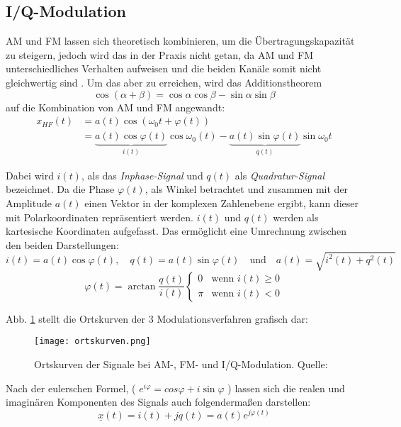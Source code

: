 \subsection{I/Q-Modulation}
\label{iq}
\ac{AM} und \ac{FM} lassen sich theoretisch kombinieren, um die Übertragungskapazität zu steigern, jedoch wird das in der Praxis nicht getan, da AM und FM unterschiedliches Verhalten aufweisen und die beiden Kanäle somit nicht gleichwertig sind \cite[vgl. Heuberger, e. a., S. 40]{Heuberger:2017}. Um das aber zu erreichen, wird das Additionstheorem 
\[ \cos (\alpha + \beta) = \cos \alpha \cos \beta - \sin \alpha \sin \beta\] 
auf die Kombination von AM und FM angewandt:
\begin{align*}
	x_{HF}(t) &= a(t) \cos (\omega_0 t + \varphi(t)) \\
			  &= \underbrace{a(t) \cos \varphi(t)}_{i(t)} \cos \omega_0(t) - \underbrace{a(t) \sin \varphi(t)}_{q(t)} \sin \omega_0t
\end{align*}

Dabei wird \(i(t) \),  als das \textit{Inphase-Signal} und \(q(t)\) als \textit{Quadratur-Signal} bezeichnet.
Da die Phase $\varphi(t)$, als Winkel betrachtet und zusammen mit der Amplitude $a(t)$ einen Vektor in der komplexen Zahlenebene ergibt, kann dieser mit Polarkoordinaten repräsentiert werden.
$i(t)$ und $q(t)$ werden als kartesische Koordinaten aufgefasst.
Das ermöglicht eine Umrechnung zwischen den beiden Darstellungen:
\[ i(t) = a(t) \cos \varphi(t),  \quad q(t) = a(t)\sin \varphi(t) \quad \text{und} \quad  a(t) = \sqrt{i^2 (t) + q^2(t)}\]
\[  \varphi (t) = \arctan \frac{q(t)}{i(t)}  
					\begin{cases} 
						0	 & \text{wenn } i(t) \geq 0 \\
						\pi  & \text{wenn } i(t) < 0
					\end{cases}
\]

Abb. \ref{ortskurven} stellt die Ortskurven der 3 Modulationsverfahren grafisch dar:
\begin{figure}[ht]
	\centering
	\texttt{[image: ortskurven.png]}
	\caption[Ortskurven der Signale bei AM-, FM- und I/Q-Modulation]{Ortskurven der Signale bei AM-, FM- und I/Q-Modulation. Quelle: \cite[Heuberger, e. a., S. 141]{Heuberger:2017}} 
	\label{ortskurven}
\end{figure}


\newpage

Nach der eulerschen Formel, ( \( e^{i\varphi} = cos \varphi + i \sin \varphi \) ) lassen sich die realen und imaginären Komponenten des Signals auch folgendermaßen darstellen:
\[ \underline{x} (t) = i(t) + jq(t) = a(t) e^{j \varphi(t)}\]

